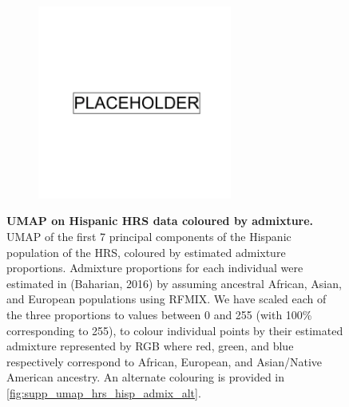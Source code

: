 \begin{figure}[ht]
    \centering
    \begin{subfigure}{\textwidth}
    \includegraphics[width=0.7\textwidth]{placeholder.png}
    \end{subfigure}
    \caption[UMAP on Hispanic HRS data coloured by admixture]{\textbf{UMAP on Hispanic HRS data coloured by admixture.} UMAP of the first 7 principal components of the Hispanic population of the HRS, coloured by estimated admixture proportions. Admixture proportions for each individual were estimated in (Baharian, 2016) by assuming ancestral African, Asian, and European populations using RFMIX. We have scaled each of the three proportions to values between 0 and 255 (with 100\% corresponding to 255), to colour individual points by their estimated admixture represented by RGB where red, green, and blue respectively correspond to African, European, and Asian/Native American ancestry. An alternate colouring is provided in \ref{fig:supp_umap_hrs_hisp_admix_alt}.}
    \label{fig:supp_umap_hrs_hisp_admix}
\end{figure}

\newpage

